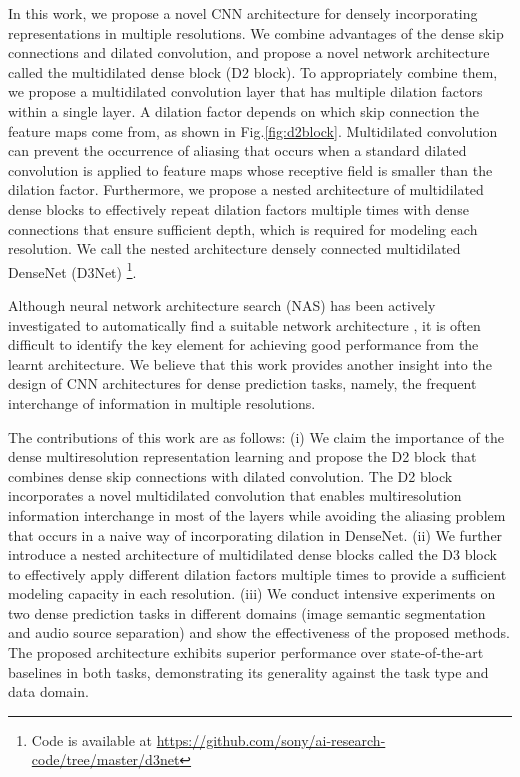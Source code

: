 \documentclass[final]{cvpr}
\begin{document}
In this work, we propose a novel CNN architecture for densely incorporating representations in multiple resolutions.
We combine advantages of the dense skip connections and dilated convolution, and propose a novel network architecture called the multidilated dense block (D2 block). To appropriately combine them, we propose a multidilated convolution layer that has multiple dilation factors within a single layer. A dilation factor depends on which skip connection the feature maps come from, as shown in Fig.\ref{fig:d2block}. Multidilated convolution can prevent the occurrence of aliasing that occurs when a standard dilated convolution is applied to feature maps whose receptive field is smaller than the dilation factor. 
Furthermore, we propose a nested architecture of multidilated dense blocks to effectively repeat dilation factors multiple times with dense connections that ensure sufficient depth, which is required for modeling each resolution. 
We call the nested architecture densely connected multidilated DenseNet (D3Net)
\footnote{Code is available at \url{https://github.com/sony/ai-research-code/tree/master/d3net}}.

Although neural network architecture search (NAS) has been actively investigated to automatically find a suitable network architecture \cite{Liu_2019_CVPR,Nekrasov_2019_CVPR}, it is often difficult to identify the key element for achieving good performance from the learnt architecture.  We believe that this work provides another insight into the design of CNN architectures for dense prediction tasks, namely, the frequent interchange of information in multiple resolutions.


The contributions of this work are as follows:
(i) We claim the importance of the dense multiresolution representation learning and propose the D2 block that combines dense skip connections with dilated convolution. The D2 block incorporates a novel multidilated convolution that enables multiresolution information interchange in most of the layers while avoiding the aliasing problem that occurs in a naive way of incorporating dilation in DenseNet. 
(ii) We further introduce a nested architecture of multidilated dense blocks called the D3 block to effectively apply different dilation factors multiple times to provide a sufficient modeling capacity in each resolution. 
(iii) We conduct intensive experiments on two dense prediction tasks in different domains (image semantic segmentation and audio source separation) and show the effectiveness of the proposed methods. The proposed architecture exhibits superior performance over state-of-the-art baselines in both tasks, demonstrating its generality against the task type and data domain.
\end{document}
